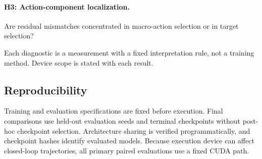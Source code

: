 \paragraph{H3: Action-component localization.}
Are residual mismatches concentrated in macro-action selection or in target
selection?

Each diagnostic is a measurement with a fixed interpretation rule, not a
training method. Device scope is stated with each result.

\subsection{Reproducibility}
\label{sec:repro}

Training and evaluation specifications are fixed before execution. Final
comparisons use held-out evaluation seeds and terminal checkpoints without
post-hoc checkpoint selection. Architecture sharing is verified
programmatically, and checkpoint hashes identify evaluated models. Because
execution device can affect closed-loop trajectories, all primary paired
evaluations use a fixed CUDA path.

